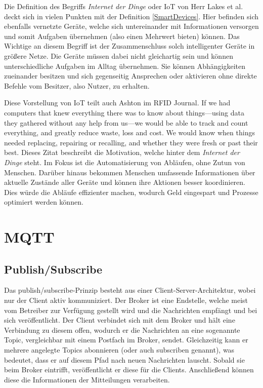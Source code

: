        Die Definition des Begriffs \emph{Internet der Dinge} oder \ac{IoT} von Herr Lakes et al. deckt sich in vielen Punkten mit der Definition \ref{SmartDevices}. Hier befinden sich ebenfalls vernetzte Geräte, welche sich untereinander mit Informationen versorgen und somit Aufgaben übernehmen (also einen Mehrwert bieten) können. Das Wichtige an diesem Begriff ist der Zusammenschluss solch intelligenter Geräte in größere Netze. Die Geräte müssen dabei nicht gleichartig sein und können unterschiedliche Aufgaben im Alltag übernehmen. Sie können Abhängigkeiten zueinander besitzen und sich gegenseitig Ansprechen oder aktivieren ohne direkte Befehle vom Besitzer, also Nutzer, zu erhalten.
        
        Diese Vorstellung von \ac{IoT} teilt auch Ashton im RFID Journal.
        \grqq If we had computers that knew everything there was to know about things—using data they gathered without any help from us—we would be able to track and count everything, and greatly reduce waste, loss and cost. We would know when things needed replacing, repairing or recalling, and whether they were fresh or past their best.\glqq{} \cite{ashton2009internet}
        Dieses Zitat beschreibt die Motivation, welche hinter dem \emph{Internet der Dinge} steht.
        Im Fokus ist die Automatisierung von Abläufen, ohne Zutun von Menschen. Darüber hinaus bekommen Menschen umfassende Informationen über aktuelle Zustände aller Geräte und können ihre Aktionen besser koordinieren. Dies würde die Abläufe effizienter machen, wodurch Geld eingespart und Prozesse optimiert werden können.

\section{MQTT}
    \subsection{Publish/Subscribe}
    Das publish/subscribe-Prinzip besteht aus einer Client-Server-Architektur, wobei nur der Client aktiv kommuniziert. Der Broker ist eine Endstelle, welche meist vom Betreiber zur Verfügung gestellt wird und die Nachrichten empfängt und bei sich veröffentlicht. Der Client verbindet sich mit dem Broker und hält eine Verbindung zu diesem offen, wodurch er die Nachrichten an eine sogenannte Topic, vergleichbar mit einem Postfach im Broker, sendet. Gleichzeitig kann er mehrere angelegte Topics abonnieren (oder auch subscriben genannt), was bedeutet, dass er auf diesem Pfad nach neuen Nachrichten lauscht. Sobald sie beim Broker eintrifft, veröffentlicht er diese für die Clients. Anschließend können diese die Informationen der Mitteilungen verarbeiten.

